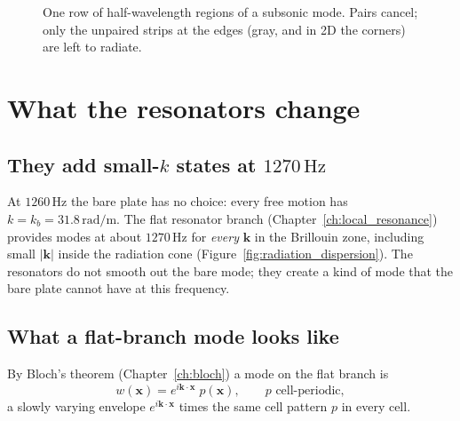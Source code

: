 \begin{figure}[htbp]
\centering
{}
\caption{One row of half-wavelength regions of a subsonic mode. Pairs cancel; only
the unpaired strips at the edges (gray, and in 2D the corners) are left to radiate.}
\label{fig:edge_radiation}
\end{figure}

\section{What the resonators change}

\subsection{They add small-$k$ states at $1270\,\mathrm{Hz}$}
At $1260\,\mathrm{Hz}$ the bare plate has no choice: every free motion has
$k = k_b = 31.8\,\mathrm{rad/m}$. The flat resonator branch
(Chapter~\ref{ch:local_resonance}) provides modes at about $1270\,\mathrm{Hz}$
for \emph{every} $\mathbf{k}$ in the Brillouin zone, including small $|\mathbf{k}|$
inside the radiation cone (Figure~\ref{fig:radiation_dispersion}). The resonators
do not smooth out the bare mode; they create a kind of mode that the bare plate
cannot have at this frequency.

\subsection{What a flat-branch mode looks like}
By Bloch's theorem (Chapter~\ref{ch:bloch}) a mode on the flat branch is
\begin{equation}
  w(\mathbf{x}) = e^{i\mathbf{k}\cdot\mathbf{x}}\; p(\mathbf{x}),
  \qquad p \text{ cell-periodic},
\end{equation}
a slowly varying envelope $e^{i\mathbf{k}\cdot\mathbf{x}}$ times the same cell
pattern $p$ in every cell.


